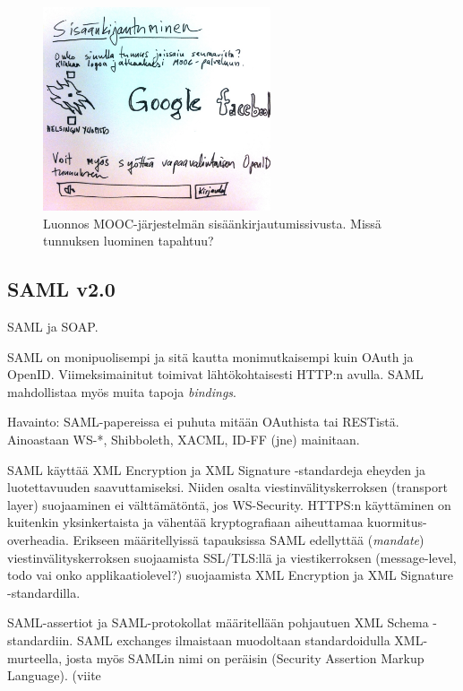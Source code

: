 \documentclass[finnish,gradu]{tktltiki}
\begin{document}
  \begin{figure}
    \centering
    \includegraphics[width=0.6\textwidth]{images/mooc_login_sketch.jpg}
    \caption{Luonnos MOOC-järjestelmän sisäänkirjautumissivusta. Missä tunnuksen luominen tapahtuu?}
    \label{fig:mooc_login_luonnos}
  \end{figure}




  \subsection{SAML v2.0} %
  \label{sub:saml_v2_0}
  SAML ja SOAP.

  SAML on monipuolisempi ja sitä kautta monimutkaisempi kuin OAuth ja OpenID. Viimeksimainitut toimivat lähtökohtaisesti HTTP:n avulla. SAML mahdollistaa myös muita tapoja \emph{bindings}.

  Havainto: SAML-papereissa ei puhuta mitään OAuthista tai RESTistä. Ainoastaan WS-*, Shibboleth, XACML, ID-FF (jne) mainitaan.

  SAML käyttää XML Encryption ja XML Signature -standardeja eheyden ja luotettavuuden saavuttamiseksi.
  Niiden osalta viestinvälityskerroksen (transport layer) suojaaminen ei välttämätöntä, jos WS-Security.
  HTTPS:n käyttäminen on kuitenkin yksinkertaista ja vähentää kryptografiaan aiheuttamaa kuormitus-overheadia.
  Erikseen määritellyissä tapauksissa SAML edellyttää (\emph{mandate}) viestinvälityskerroksen suojaamista SSL/TLS:llä ja viestikerroksen (message-level, todo vai onko applikaatiolevel?) suojaamista XML Encryption ja XML Signature -standardilla.

  SAML-assertiot ja SAML-protokollat määritellään pohjautuen XML Schema -standardiin.
  SAML exchanges ilmaistaan muodoltaan standardoidulla XML-murteella, josta myös SAMLin nimi on peräisin (Security Assertion Markup Language). (viite
\end{document}
